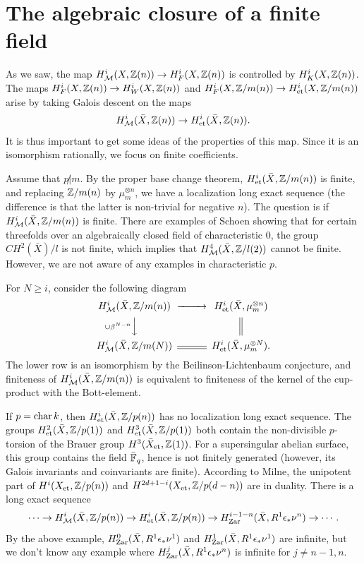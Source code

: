 \documentclass[nospthms,envcountsect]{svmult} %
\begin{document}





\section{The algebraic closure of a finite field}
As we saw, the map $H^i_{\mathcal M}(X,{{\mathbb Z}}(n))\to H^i_F(X,{{\mathbb Z}}(n))$
is controlled by $H^i_K(X,{{\mathbb Z}}(n))$. The maps 
$H^i_F(X,{{\mathbb Z}}(n))\to H^i_W(X,{{\mathbb Z}}(n))$
and $H^i_F(X,{{\mathbb Z}}/m(n))\to H^i_{\text{\rm et}}(X,{{\mathbb Z}}/m(n))$ arise
by taking Galois descent on the maps 
$$ H^i_{\mathcal M}(\bar X,{{\mathbb Z}}(n)) \to H^i_{\text{\rm et}}(\bar X,{{\mathbb Z}}(n)).$$
It is thus important to get some ideas of the properties of
this map. Since it is an isomorphism rationally, we focus on
finite coefficients.
 

Assume that $p\not|m$. By the proper base change theorem, 
$H^i_{\text{\rm et}}(\bar X,{{\mathbb Z}}/m(n))$ is finite, and replacing ${{\mathbb Z}}/m(n)$
by $\mu_m^{\otimes n}$, we have a localization long exact
sequence (the difference is that the latter is non-trivial for negative $n$). 
The question is if $H^i_{\mathcal M}(\bar X,{{\mathbb Z}}/m(n))$ is finite.
There are examples of Schoen showing that for certain threefolds
over an algebraically closed field of characteristic $0$, the group
$CH^2(\bar X)/l$ is not finite, which implies
that $H^4_{\mathcal M}(\bar X,{{\mathbb Z}}/l(2))$ cannot be finite. However, we are
not aware of any examples in characteristic $p$.

For $N\geq i$, consider the following diagram
$$\begin{CD}
H^i_\Nis(\bar X,\Z/m(n)) @>>> H^i_\et(\bar X,\mu_m^{\otimes n})\\
@V\cup \beta^{N-n} VV @| \\ 
H^i_\Nis(\bar X,\Z/m(N)) @= H^i_\et(\bar X,\mu_m^{\otimes N}).
\end{CD}$$
The lower row is an isomorphism by the Beilinson-Lichtenbaum
conjecture, and finiteness of $H^i_{\mathcal M}(\bar X,{{\mathbb Z}}/m(n))$ is 
equivalent to finiteness of the kernel of the cup-product with the Bott-element.

If $p=\operatorname{char} k$, then $H^i_{\text{\rm et}}(\bar X,{{\mathbb Z}}/p(n))$ has no localization
long exact sequence.
The groups  $H^2_{\text{\rm et}}(\bar X,{{\mathbb Z}}/p(1))$ and 
$H^3_{\text{\rm et}}(\bar X,{{\mathbb Z}}/p(1))$ both contain the non-divisible $p$-torsion
of the Brauer group $H^3(\bar X_{\text{\rm et}},{{\mathbb Z}}(1))$. 
For a supersingular abelian surface,
this group contains the field $\bar {{{\mathbb F}}}_q$, hence is not finitely
generated (however, its Galois invariants and coinvariants are
finite). According to Milne, the unipotent part of 
$H^i(X_{\text{\rm et}},{{\mathbb Z}}/p(n))$ and $H^{2d+1-i}(X_{\text{\rm et}},{{\mathbb Z}}/p(d-n))$ are in 
duality. 
There is a long exact sequence
$$\cdots  \to H^i_{\mathcal M}(\bar X,{{\mathbb Z}}/p(n)) \to H^i_{\text{\rm et}}(\bar X,{{\mathbb Z}}/p(n)) 
\to H^{i-1-n}_{\text{\rm Zar}}(\bar X,R^1\epsilon_* \nu^n)\to\cdots .$$
By the above example, $H^0_{\text{\rm Zar}}(\bar X,R^1\epsilon_* \nu^1)$
and $H^1_{\text{\rm Zar}}(\bar X,R^1\epsilon_* \nu^1)$ are infinite, but 
we don't know any example where $H^j_{\text{\rm Zar}}(\bar X,R^1\epsilon_* \nu^n)$ 
is infinite for $j\not= n-1, n$.
\end{document}
